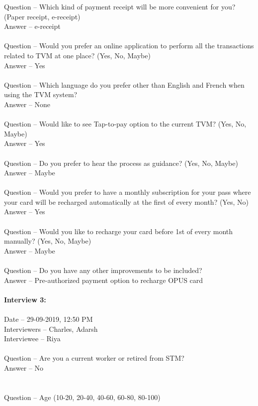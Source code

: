\documentclass[a4paper, 11pt]{report}
\begin{document}
{Question – Which kind of payment receipt will be more convenient for you? (Paper receipt, e-receipt)\\
Answer – e-receipt\\\\
Question – Would you prefer an online application to perform all the transactions related to TVM at one place? (Yes, No, Maybe)\\
Answer – Yes\\\\
Question – Which language do you prefer other than English and French when using the TVM system?\\
Answer – None\\\\
Question – Would like to see Tap-to-pay option to the current TVM? (Yes, No, Maybe)\\
Answer – Yes\\\\
Question – Do you prefer to hear the process as guidance? (Yes, No, Maybe)\\
Answer – Maybe\\\\
Question – Would you prefer to have a monthly subscription for your pass where your card will be recharged automatically at the first of every month? (Yes, No)\\
Answer – Yes\\\\
Question – Would you like to recharge your card before 1st of every month manually? (Yes, No, Maybe)\\
Answer – Maybe\\\\
Question – Do you have any other improvements to be included?\\
Answer – Pre-authorized payment option to recharge OPUS card\\\\
\textbf{Interview 3:}\\\\
Date – 29-09-2019, 12:50 PM \\
Interviewers – Charles, Adarsh\\
Interviewee – Riya \\\\
Question – Are you a current worker or retired from STM?\\
Answer – No\\\\\\
Question – Age (10-20, 20-40, 40-60, 60-80, 80-100)\\
}
\end{document}

